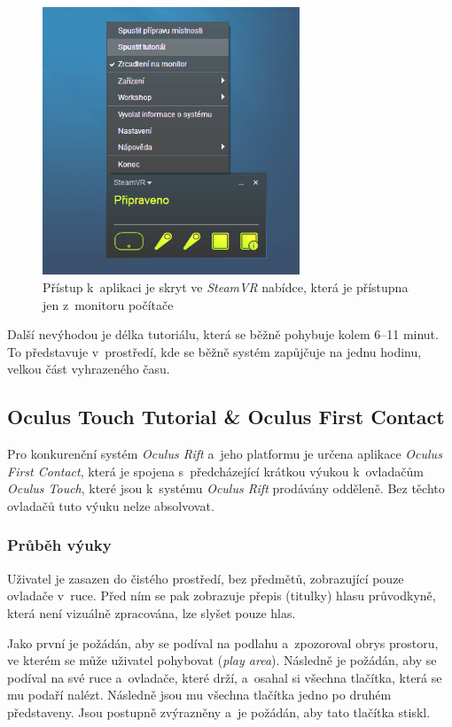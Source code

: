 \begin{figure}[h!]
\centering
\includegraphics[height=8cm]{src/assets/hidden-menu.png}
\caption{Přístup k~aplikaci je skryt ve \emph{SteamVR} nabídce, která je
přístupna jen z~monitoru počítače}
\end{figure}

Další nevýhodou je délka tutoriálu, která se běžně pohybuje kolem 6--11
minut. To představuje v~prostředí, kde se běžně systém zapůjčuje na
jednu hodinu, velkou část vyhrazeného času.

\subsection{Oculus Touch Tutorial \& Oculus First
Contact}\label{oculus-touch-tutorial-oculus-first-contact}

Pro konkurenční systém \emph{Oculus Rift} a~jeho platformu je určena
aplikace \emph{Oculus First Contact}, která je spojena s~předcházející
krátkou výukou k~ovladačům \emph{Oculus Touch}, které jsou k~systému
\emph{Oculus Rift} prodávány odděleně. Bez těchto ovladačů tuto výuku
nelze absolvovat.

\subsubsection{Průběh výuky}\label{prux16fbux11bh-vuxfduky-1}

Uživatel je zasazen do čistého prostředí, bez předmětů, zobrazující
pouze ovladače v~ruce. Před ním se pak zobrazuje přepis (titulky) hlasu
průvodkyně, která není vizuálně zpracována, lze slyšet pouze hlas.

Jako první je požádán, aby se podíval na podlahu a~zpozoroval obrys
prostoru, ve kterém se může uživatel pohybovat (\emph{play area}).
Následně je požádán, aby se podíval na své ruce a~ovladače, které drží,
a~osahal si všechna tlačítka, která se mu podaří nalézt. Následně jsou
mu všechna tlačítka jedno po druhém představeny. Jsou postupně
zvýrazněny a~je požádán, aby tato tlačítka stiskl.

